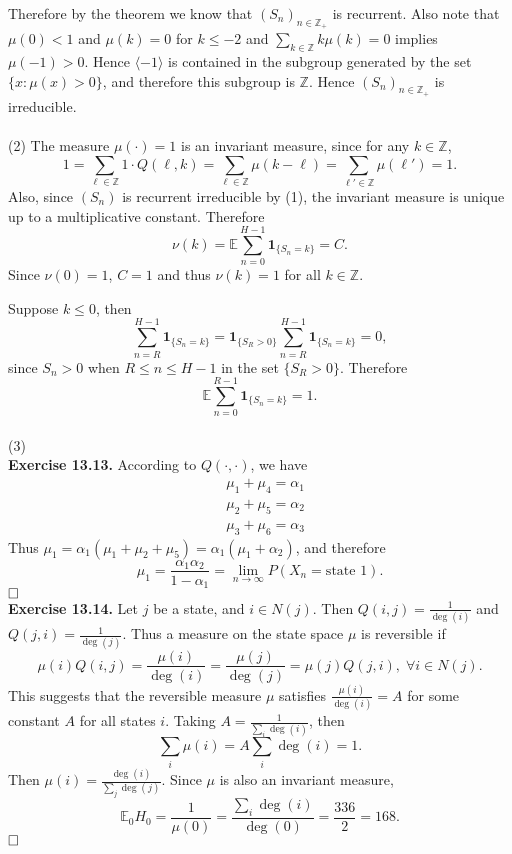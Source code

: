 \documentclass[12pt]{extarticle}
\begin{document}
Therefore by the theorem we know that $(S_n)_{n\in\mathbb{Z}_+}$ is recurrent.
Also note that $\mu(0)<1$ and $\mu(k)=0$ for $k\leq -2$ and $\sum_{k\in\mathbb{Z}}k\mu(k)=0$ implies $\mu(-1)>0$. Hence $\langle -1\rangle$ is contained in the subgroup generated by the set $\{x:\mu(x)>0\}$, and therefore this subgroup is $\mathbb{Z}$. Hence $(S_n)_{n\in\mathbb{Z}_+}$ is irreducible. \\ \\
(2) The measure $\mu(\cdot)=1$ is an invariant measure, since for any $k\in\mathbb{Z}$,
\[
1=\sum_{\ell\in\mathbb{Z}}1\cdot Q(\ell,k)=\sum_{\ell\in\mathbb{Z}}\mu(k-\ell)
=\sum_{\ell'\in\mathbb{Z}}\mu(\ell')=1.
\] 
Also, since $(S_n)$ is recurrent irreducible by (1), the invariant measure is unique up to a multiplicative constant. Therefore
\[
\nu(k)=\mathbb{E}\sum_{n=0}^{H-1}\mathbf{1}_{\{S_n=k\}}=C.
\] 
Since $\nu(0)=1$, $C=1$ and thus $\nu(k)=1$ for all $k\in\mathbb{Z}$.

Suppose $k\leq 0$, then
\[
\sum_{n=R}^{H-1}\mathbf{1}_{\{S_n=k\}}
=
\mathbf{1}_{\{S_R>0\}}\sum_{n=R}^{H-1}\mathbf{1}_{\{S_n=k\}}=0,
\]
since $S_n>0$ when $R\leq n\leq H-1$ in the set $\{S_R>0\}$. Therefore
\[
\mathbb{E}\sum_{n=0}^{R-1}\mathbf{1}_{\{S_n=k\}}=1.
\] \\
(3)  \\

\noindent
\textbf{Exercise 13.13.}
According to $Q(\cdot,\cdot)$, we have
\[
\begin{aligned}
&\mu_1+\mu_4=\alpha_1 \\
&\mu_2+\mu_5=\alpha_2 \\
&\mu_3+\mu_6=\alpha_3
\end{aligned}
\]
Thus
$\mu_1=\alpha_1(\mu_1+\mu_2+\mu_5)=\alpha_1(\mu_1+\alpha_2)$, and therefore  \[
\mu_1=\frac{\alpha_1\alpha_2}{1-\alpha_1}=\lim_{n\rightarrow\infty}P(X_n=\text{state } 1).
\]
$\hspace{\fill}\square$\\

\noindent
\textbf{Exercise 13.14.}
Let $j$ be a state, and $i\in N(j)$.
Then $Q(i,j)=\frac{1}{\deg(i)}$ and $Q(j,i)=\frac{1}{\deg(j)}$.
Thus a measure on the state space $\mu$ is reversible if
\[
\mu(i)Q(i,j)=\frac{\mu(i)}{\deg(i)}=\frac{\mu(j)}{\deg(j)}=\mu(j)Q(j,i),\;\forall i\in N(j).
\]
This suggests that the reversible measure $\mu$ satisfies $\frac{\mu(i)}{\deg(i)}=A$ for some constant $A$ for all states $i$.
Taking $A=\frac{1}{\sum_i\deg(i)}$, then
\[
\sum_i\mu(i)=A\sum_{i}\deg(i)=1.
\]
Then $\mu(i)=\frac{\deg(i)}{\sum_{j}\deg(j)}$.
Since $\mu$ is also an invariant measure,
\[
\mathbb{E}_0H_0=\frac{1}{\mu(0)}=\frac{\sum_i\deg(i)}{\deg(0)}
=
\frac{336}{2}=168.
\]
$\hspace{\fill}\square$
\end{document}
